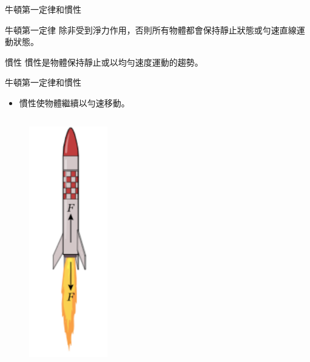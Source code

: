 \documentclass[beamer=true]{standalone}
\begin{document}
\begin{frame}{牛頓第一定律和慣性}
    \begin{alertblock}
        {牛頓第一定律}
        除非受到淨力作用，否則所有物體都會保持靜止狀態或勻速直線運動狀態。
    \end{alertblock}
    \begin{exampleblock}
        {慣性}
        慣性是物體保持靜止或以均勻速度運動的趨勢。
    \end{exampleblock}
\end{frame}
\begin{frame}{牛頓第一定律和慣性}
    \begin{itemize}
        \item 慣性使物體繼續以勻速移動。\bigskip\bigskip
    \end{itemize}
    \begin{columns}
        \begin{figure}[h!]
            \centering
            \includegraphics[width=0.4\textwidth]{assets/c32f5f7b.png}
        \end{figure}
        \begin{figure}[h!]

\end{figure}
\end{columns}
\end{frame}
\end{document}
